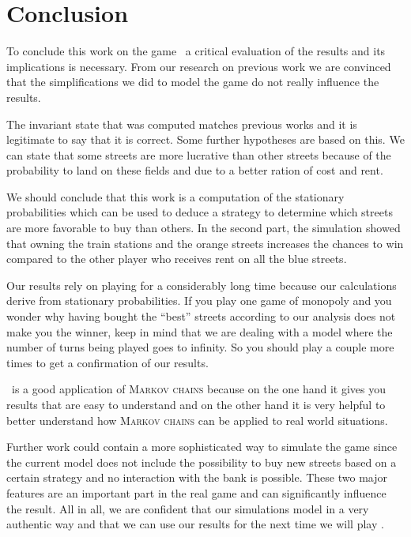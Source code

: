 \section{Conclusion} %
\label{sec:conclusion}

To conclude this work on the game \monopoly~a critical evaluation of the results and its 
implications is necessary. From our research on previous work we are convinced that the 
simplifications we did to model the game do not really influence the results. 

The invariant state that was computed matches previous works and it is legitimate to say 
that it is correct. Some further hypotheses are based on this. 
We can state that some streets are more lucrative than other streets because of the 
probability to land on these fields and due to a better ration of cost and rent.

We should conclude that this work is a computation of the stationary probabilities which can 
be used to deduce a strategy to determine which streets are more favorable to buy than others.
In the second part, the simulation showed that owning the train stations and the orange streets 
increases the chances to win compared to the other player who receives rent on all the blue 
streets. 

Our results rely on playing for a considerably long time because our calculations derive from 
stationary probabilities. If you play one game of monopoly and you wonder why having bought the ``best'' 
streets according to our analysis does not make you the winner, keep in mind that we are dealing 
with a model where the number of turns being played goes to infinity. So you should play a couple 
more times to get a confirmation of our results.

\monopoly~is a good application of \textsc{Markov chains} because on the one hand it gives you results
that are easy to understand and on the other hand it is very helpful to better
understand how \textsc{Markov chains} can be applied to real world situations.

Further work could contain a more sophisticated way to simulate the game since the current model
does not include the possibility to buy new streets based on a certain strategy and no interaction
with the bank is possible. These two major features are an important part in the real game and 
can significantly influence the result. 
All in all, we are confident that our simulations model \monopoly in a 
very authentic way and that we can use our results for the next time we will play \monopoly.

